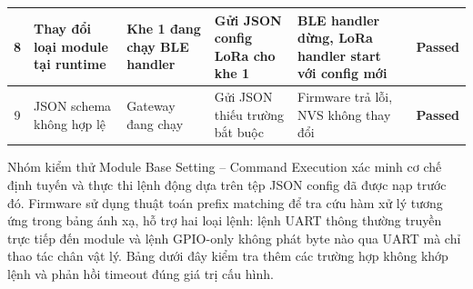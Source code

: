 \begin{longtable}{|c|p{2cm}|p{2.5cm}|p{3.5cm}|p{4cm}|c|}
            8 & Thay đổi loại module tại runtime & Khe 1 đang chạy BLE handler & Gửi JSON config LoRa cho khe 1 & BLE handler dừng, LoRa handler start với config mới & \textcolor{modern_blue}{\textbf{Passed}} \\ \hline
            9 & JSON schema không hợp lệ & Gateway đang chạy & Gửi JSON thiếu trường bắt buộc & Firmware trả lỗi, NVS không thay đổi & \textcolor{modern_blue}{\textbf{Passed}} \\ \hline
        \end{longtable}

        Nhóm kiểm thử Module Base Setting -- Command Execution xác minh cơ chế định tuyến và thực thi lệnh động dựa trên tệp JSON config đã được nạp trước đó. Firmware sử dụng thuật toán prefix matching để tra cứu hàm xử lý tương ứng trong bảng ánh xạ, hỗ trợ hai loại lệnh: lệnh UART thông thường truyền trực tiếp đến module và lệnh GPIO-only không phát byte nào qua UART mà chỉ thao tác chân vật lý. Bảng dưới đây kiểm tra thêm các trường hợp không khớp lệnh và phản hồi timeout đúng giá trị cấu hình.

